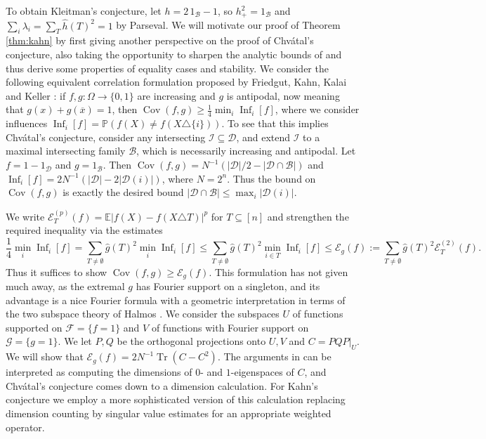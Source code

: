 \documentclass{article}
\theoremstyle{plain}
\theoremstyle{definition}
\newcommand{\mc}[1]{\mathcal{#1}}
\newcommand{\mb}[1]{\mathbb{#1}}
\newcommand{\sub}{\subseteq}
\newcommand{\ov}{\overline}
\newcommand{\es}{\emptyset}
\newcommand{\cE}{\mathcal E}
\newcommand{\OO}{\Omega}
\newcommand{\on}{\operatorname}
\begin{document}
To obtain Kleitman's conjecture, let $h=2\,1_{\mc B}-1$, so $h_+^2=1_{\mc B}$ 
and $\sum_i \lambda_i = \sum_T \widehat h(T)^2 = 1$ by Parseval.
We will motivate our proof of Theorem \ref{thm:kahn} by first giving 
another perspective on the proof of Chv\'atal's conjecture,
also taking the opportunity to sharpen the analytic bounds of \cite{CLL} 
and thus derive some properties of equality cases and stability.
We consider the following equivalent correlation formulation
proposed by Friedgut, Kahn, Kalai and Keller \cite{FKKK}:
if $f,g:\OO\to\{0,1\}$ are increasing and $g$ is antipodal, 
now meaning that $g(x)+g(\ov x)=1$, then $\on{Cov}(f,g)\ge\frac14\min_i\on{Inf}_i[f]$,
where we consider influences $\on{Inf}_i[f]=\mb P(f(X)\ne f(X\triangle\{i\}))$.
To see that this implies Chv\'atal's conjecture, consider any intersecting $\mc I\sub\mc D$, 
and extend $\mc I$ to a maximal intersecting family $\mc B$, which is necessarily increasing and antipodal.
Let $f=1-1_{\mc D}$ and $g=1_{\mc B}$.  Then $\on{Cov}(f,g)=N^{-1}(|\mc D|/2-|\mc D\cap\mc B|)$ 
and  $\on{Inf}_i[f]=2N^{-1}(|\mc D|-2|\mc D(i)|)$, where $N=2^n$. Thus the bound on $\on{Cov}(f,g)$
is exactly the desired bound $|\mc D\cap\mc B|\le\max_i|\mc D(i)|$.

We write  $\cE_T^{(p)}(f)=\mb E|f(X)-f(X\triangle T)|^p$ for $T \sub [n]$ 
and strengthen the required inequality via the estimates
\[ \frac14\min_i\on{Inf}_i[f] = \sum_{T\ne\es} \widehat g(T)^2 \min_i\on{Inf}_i[f]
\le \sum_{T\ne\es} \widehat g(T)^2 \min_{i \in T} \on{Inf}_i[f] \le \mc E_g(f) := \sum_{T\ne\es}\widehat g(T)^2\cE_T^{(2)}(f). \]
Thus it suffices to show $\on{Cov}(f,g)\ge \mc E_g(f)$.
This formulation has not given much away,
as the extremal $g$ has Fourier support on a singleton,
and its advantage is a nice Fourier formula
with a geometric interpretation 
in terms of the two subspace theory of Halmos \cite{Halmos}.
We consider the subspaces $U$ of functions supported on $\mc F=\{f=1\}$ 
and $V$ of functions with Fourier support on $\mc G=\{g=1\}$.
We let $P,Q$ be the orthogonal projections onto $U,V$ and $C=PQP|_U$.
We will show that $\mc E_g(f) = 2N^{-1} \on{Tr}(C-C^2)$.
The arguments in \cite{CLL} can be interpreted as computing 
the dimensions of $0$- and $1$-eigenspaces of $C$,
and Chv\'atal's conjecture comes down to a dimension calculation.
For Kahn's conjecture we employ a more sophisticated version
of this calculation replacing dimension counting 
by singular value estimates
for an appropriate weighted operator.
\end{document}
